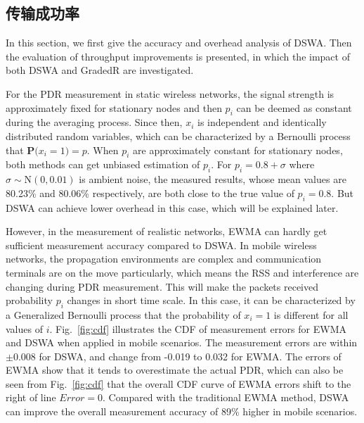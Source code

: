 \begin{figure}[!htp]
\centering
\hspace{1in}
\centering
\end{figure}

\subsection{传输成功率}
\label{sec:pdr}

In this section, we first give the accuracy and overhead analysis of DSWA. Then the evaluation of throughput improvements is presented, in which the impact of both DSWA and GradedR are investigated.

For the PDR measurement in static wireless networks, the signal strength is approximately fixed for stationary nodes \cite{reis2006model} and then $p_i$ can be deemed as constant during the averaging process. Since then, $x_i$ is independent and identically distributed random variables, which can be characterized by a Bernoulli process that $\textbf{P(}x_i=1\textbf{)}=p$. When $p_i$ are approximately constant for stationary nodes, both methods can get unbiased estimation of $p_i$. For $p_i=0.8+\sigma$ where $\sigma\sim \textrm{N}(0,0.01)$ is ambient noise, the measured results, whose mean values are 80.23\% and 80.06\% respectively, are both close to the true value of $p_i=0.8$. But DSWA can achieve lower overhead in this case, which will be explained later.

However, in the measurement of realistic networks, EWMA can hardly get sufficient measurement accuracy compared to DSWA. In mobile wireless networks, the propagation environments are complex and communication terminals are on the move particularly, which means the RSS and interference are changing during PDR measurement. This will make the packets received probability $p_i$ changes in short time scale. In this case, it can be characterized by a Generalized Bernoulli process that the probability of $x_i=1$ is different for all values of $i$.
Fig.~\ref{fig:cdf} illustrates the CDF of measurement errors for EWMA and DSWA when applied in mobile scenarios. The measurement errors are within $\pm$0.008 for DSWA, and change from -0.019 to 0.032 for EWMA. The errors of EWMA show that it tends to overestimate the actual PDR, which can also be seen from Fig.~\ref{fig:cdf} that the overall CDF curve of EWMA errors shift to the right of line $Error=0$. Compared with the traditional EWMA method, DSWA can improve the overall measurement accuracy of 89\% higher in mobile scenarios.


